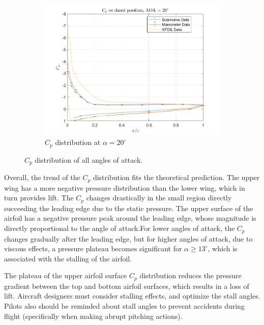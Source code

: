 \documentclass[runningheads]{llncs}
\begin{document}
\begin{figure}[h]
\begin{subfigure}[b]{0.3\textwidth}
        \includegraphics[width=\textwidth]{figures/AOA20.png}
        \caption{$C_p$ distribution at $\alpha = 20^\circ$}
        \label{fig:cp_20}
    \end{subfigure}
    \caption{$C_p$ distribution of all angles of attack.}
    \label{fig:cp}
\end{figure}

\noindent
Overall, the trend of the $C_p$ distribution fits the theoretical prediction. The upper wing has a more negative pressure distribution than the lower wing, which in turn provides lift. The $C_p$ changes drastically in the small region directly succeeding the leading edge due to the static pressure. The upper surface of the airfoil has a negative pressure peak around the leading edge, whose magnitude is directly proportional to the angle of attack.For lower angles of attack, the $C_p$ changes gradually after the leading edge, but for higher angles of attack, due to viscous effects, a pressure plateau becomes significant for $\alpha \ge 13^\circ$, which is associated with the stalling of the airfoil.\newline 

\noindent
The plateau of the upper airfoil surface $C_p$ distribution reduces the pressure gradient between the top and bottom airfoil surfaces, which results in a loss of lift. Aircraft designers must consider stalling effects, and optimize the stall angles. Pilots also should be reminded about stall angles to prevent accidents during flight (specifically when making abrupt pitching actions).\newline
\end{document}
